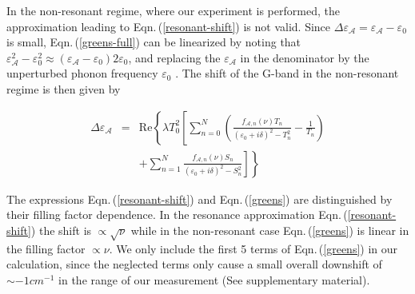 \documentclass[prl,aps,superscriptaddress,showpacs,reprint]{revtex4-1}
\begin{document}
In the non-resonant regime, where our experiment is performed, the approximation leading to Eqn.\,(\ref{resonant-shift}) is not valid. Since  $\Delta\varepsilon_{\mathcal{A}} = \varepsilon_{\mathcal{A}} - \varepsilon_0$ is small, Eqn.\,(\ref{greens-full}) can be linearized by noting that $\varepsilon_{\mathcal{A}}^2-\varepsilon_0^2 \approx (\varepsilon_{\mathcal{A}}-\varepsilon_0)2\varepsilon_0$, and  replacing the $\varepsilon_{\mathcal{A}}$ in the denominator by the unperturbed phonon frequency $\varepsilon_0$ \cite{ando2007magnetic}. The shift of the G-band in the non-resonant regime is then given by

\begin{eqnarray}
\label{greens}
\Delta\varepsilon_{\mathcal{A}} &=& \mathrm{Re}\left\lbrace \lambda T_0^2 \left[ \sum_{n=0}^N\left(\frac{f_{\mathcal{A},n}\left(\nu\right) T_n}{\left(\varepsilon_{0}+i\delta\right)^2-T_n^2}-\frac{1}{T_n}\right)\right.\right.\nonumber \\
& &\left.\left. +\sum_{n=1}^{N}\frac{f_{\mathcal{A},n}\left(\nu\right) S_n}{\left(\varepsilon_{0}+i\delta\right)^2-S_n^2}\right]\right\rbrace
\end{eqnarray}

The expressions Eqn.\,(\ref{resonant-shift}) and Eqn.\,(\ref{greens}) are distinguished by their filling factor dependence. In the resonance approximation Eqn.\,(\ref{resonant-shift}) the shift is $\propto \sqrt{\nu}$ while in the non-resonant case Eqn.\,(\ref{greens}) is linear in the filling factor $\propto \nu$.
We only include the first 5 terms of Eqn.\,(\ref{greens}) in our calculation, since the neglected terms only cause a small overall downshift of $\sim -1cm^{-1}$ in the range of our measurement (See supplementary material).
\end{document}
